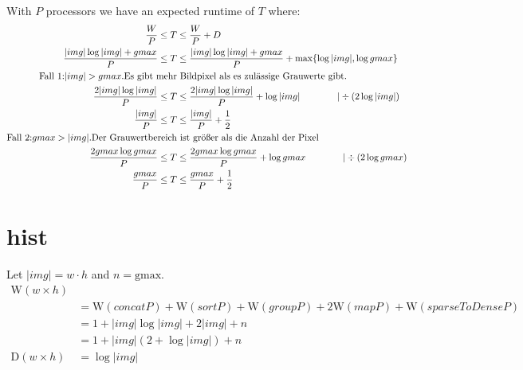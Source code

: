\documentclass{article}
\newcommand{\eqdo}[0]{\hskip 4em}
\newcommand{\W}[0]{\textrm{W}}
\newcommand{\D}[0]{\textrm{D}}
\begin{document}
      \paragraph{}
        With $P$ processors we have an expected runtime of $T$ where:
        \begin{equation}
        \begin{split}
          \frac{W}{P} \leq T & \leq \frac{W}{P} + D \\
          \frac{|img| \log |img| + gmax}{P} \leq T & \leq \frac{|img| \log |img| + gmax}{P} + \max\{\log |img|,\log gmax\} \\
          \textrm{Fall 1:} |img| > gmax. \textrm{Es gibt mehr}&\textrm{ Bildpixel als es zulässige Grauwerte gibt.}\\
          \frac{2|img| \log |img|}{P} \leq T & \leq \frac{2|img| \log |img|}{P} + \log |img| \eqdo | \div(2\log |img|) \\
          \frac{|img|}{P} \leq T & \leq \frac{|img|}{P} + \frac{1}{2} \\
          \textrm{Fall 2:} gmax > |img|. \textrm{Der Grauwertbereich}&\textrm{ ist größer als die Anzahl der Pixel}\\
          \frac{2 gmax \log gmax}{P} \leq T & \leq \frac{2 gmax \log gmax}{P} + \log gmax \eqdo | \div(2\log gmax) \\
          \frac{gmax}{P} \leq T & \leq \frac{gmax}{P} + \frac{1}{2}
        \end{split}
        \end{equation}
        
      
    \section{hist}
      Let $|img|=w\cdot h$ and $n=\textrm{gmax}$.
      \begin{equation}
      \begin{split}
      \W(w \times h) & \\
            & = \W(concatP) + \W(sortP) + \W(groupP) + 2\W(mapP) + \W(sparseToDenseP) \\
            & = 1 + |img| \log |img| + 2|img| + n \\
            & = 1 + |img| (2 + \log |img|) + n  \\
      \D(w \times h) & = \log |img| \\
      \end{split}
      \end{equation}
      
\end{document}
